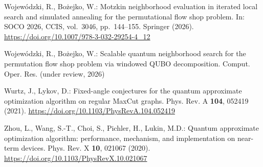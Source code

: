 \documentclass{svproc}
\newif\ifblind
\begin{document}
\begin{thebibliography}{22}
\ifblind
[Authors omitted for blind review]: Motzkin neighborhood evaluation in
iterated local search and simulated annealing for the permutational
flow shop problem. In: SOCO 2026, CCIS, vol.\ 3046, pp.\ 144--155.
Springer (2026)
\else
Wojew\'{o}dzki, R., Bo\.{z}ejko, W.: Motzkin neighborhood evaluation in
iterated local search and simulated annealing for the permutational
flow shop problem. In: SOCO 2026, CCIS, vol.\ 3046, pp.\ 144--155.
Springer (2026). \url{https://doi.org/10.1007/978-3-032-29254-4_12}
\fi

\ifblind
[Authors omitted for blind review]: Scalable quantum neighborhood search
for the permutation flow shop problem via windowed QUBO decomposition.
Comput. Oper. Res. (under review, 2026)
\else
Wojew\'{o}dzki, R., Bo\.{z}ejko, W.: Scalable quantum neighborhood search
for the permutation flow shop problem via windowed QUBO decomposition.
Comput. Oper. Res. (under review, 2026)
\fi

Wurtz, J., Lykov, D.: Fixed-angle conjectures for the quantum approximate
optimization algorithm on regular MaxCut graphs. Phys. Rev. A
\textbf{104}, 052419 (2021).
\url{https://doi.org/10.1103/PhysRevA.104.052419}

Zhou, L., Wang, S.-T., Choi, S., Pichler, H., Lukin, M.D.: Quantum
approximate optimization algorithm: performance, mechanism, and
implementation on near-term devices. Phys. Rev. X \textbf{10}, 021067
(2020). \url{https://doi.org/10.1103/PhysRevX.10.021067}

\end{thebibliography}
\end{document}

